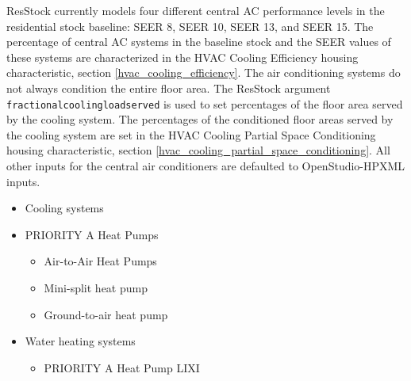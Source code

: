 ResStock currently models four different central AC performance levels in the residential stock baseline: SEER 8, SEER 10, SEER 13, and SEER 15. The percentage of central AC systems in the baseline stock and the SEER values of these systems are characterized in the HVAC Cooling Efficiency housing characteristic, section \ref{hvac_cooling_efficiency}. The air conditioning systems do not always condition the entire floor area. The ResStock argument \texttt{fractional\textunderscore cooling\textunderscore load\textunderscore served} is used to set percentages of the floor area served by the cooling system. The percentages of the conditioned floor areas served by the cooling system are set in the HVAC Cooling Partial Space Conditioning housing characteristic, section \ref{hvac_cooling_partial_space_conditioning}. All other inputs for the central air conditioners are defaulted to OpenStudio-HPXML inputs.
\begin{itemize}
\item	Cooling systems
\item	PRIORITY A Heat Pumps
    \begin{itemize}
        \item	Air-to-Air Heat Pumps
        \item	Mini-split heat pump
        \item	Ground-to-air heat pump
    \end{itemize}

\item	Water heating systems
    \begin{itemize}
        \item	PRIORITY A Heat Pump LIXI
    \end{itemize}
\end{itemize}
